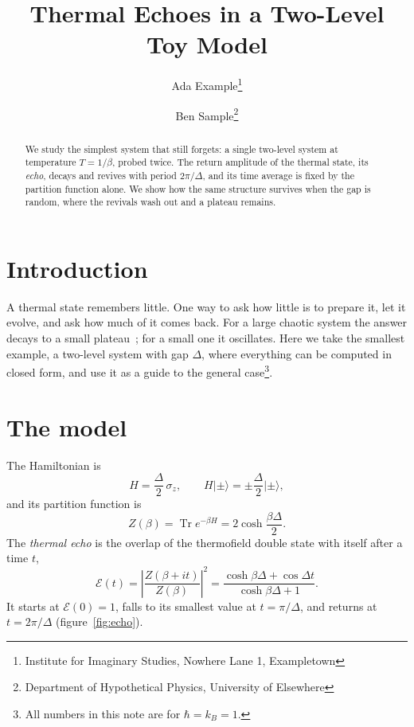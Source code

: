 \documentclass[11pt]{article}
\title{Thermal Echoes in a Two-Level Toy Model}
\author{Ada Example\thanks{Institute for Imaginary Studies, Nowhere Lane 1, Exampletown}
  \and Ben Sample\thanks{Department of Hypothetical Physics, University of Elsewhere}}
\date{}
\newcommand{\Tr}{\operatorname{Tr}}
\newcommand{\ket}[1]{\lvert #1 \rangle}
\begin{document}
\maketitle

\begin{abstract}
We study the simplest system that still forgets: a single two-level system at temperature $T=1/\beta$, probed
twice. The return amplitude of the thermal state, its \emph{echo}, decays and revives with period $2\pi/\Delta$,
and its time average is fixed by the partition function alone. We show how the same structure survives when the
gap is random, where the revivals wash out and a plateau remains.
\end{abstract}

\section{Introduction}

A thermal state remembers little. One way to ask how little is to prepare it, let it evolve, and ask how much of it
comes back. For a large chaotic system the answer decays to a small plateau~\cite{Toy1}; for a small one it
oscillates. Here we take the smallest example, a two-level system with gap $\Delta$, where everything can be
computed in closed form, and use it as a guide to the general case\footnote{All numbers in this note are for
$\hbar = k_B = 1$.}.

\section{The model}
\label{sec:model}

The Hamiltonian is
\begin{equation}
  H = \frac{\Delta}{2}\,\sigma_z , \qquad H\ket{\pm} = \pm\frac{\Delta}{2}\ket{\pm},
  \label{eq:H}
\end{equation}
and its partition function is
\begin{equation}
  Z(\beta) = \Tr e^{-\beta H} = 2\cosh\frac{\beta\Delta}{2}.
  \label{eq:Z}
\end{equation}
The \emph{thermal echo} is the overlap of the thermofield double state with itself after a time $t$,
\begin{equation}
  \mathcal{E}(t) = \left| \frac{Z(\beta + i t)}{Z(\beta)} \right|^2
  = \frac{\cosh\beta\Delta + \cos\Delta t}{\cosh\beta\Delta + 1}.
  \label{eq:echo}
\end{equation}
It starts at $\mathcal{E}(0)=1$, falls to its smallest value at $t=\pi/\Delta$, and returns at $t = 2\pi/\Delta$
(figure~\ref{fig:echo}).
\end{document}
